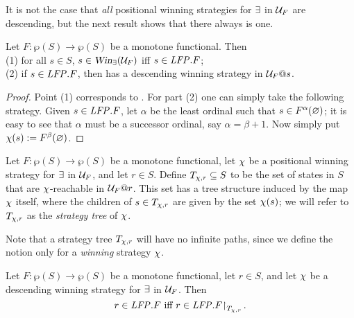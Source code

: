 It is not the case that \emph{all} positional winning strategies for $\exists$ 
in $\mathcal{U}_{F}$ are descending, but the next result shows that there always is one.

\begin{proposition}
\label{p:unfg}
Let $F: \wp(S)\to \wp(S)$ be a monotone functional.
Then
\\(1) for all $s \in S$, $s \in \win_{\eloise}(\UG_{F})$ iff $s \in \mathit{LFP}. F$;
\\(2) if $s \in \mathit{LFP}. F$, then \eloise has a descending winning strategy in 
$\mathcal{U}_{F}@s$.
\end{proposition}

\begin{proof}
Point (1) corresponds to \cite[Theorem 3.14(2)]{Ven08}.
For part (2) one can simply take the following strategy.
Given $s \in \mathit{LFP}.F$, let $\alpha$ be the least ordinal such that $s \in 
F^{\alpha}(\varnothing)$; it is easy to see that $\alpha$ must be a successor ordinal,
say $\alpha = \beta + 1$. 
Now simply put $\chi(s) := F^{\beta}(\varnothing)$.
\end{proof}

\begin{definition}
\label{d:str-tree}
Let $F: \wp(S)\to \wp(S)$ be a monotone functional, let $\chi$ be a 
positional winning strategy for $\exists$ in $\mathcal{U}_{F}$, and let $r \in S$. 
Define $T_{\chi,r} \subseteq S$ to be the set of states in $S$ that are 
$\chi$-reachable in $\mathcal{U}_{F}@r$.
This set has a tree structure induced by the map $\chi$ itself, where the 
children of $s \in T_{\chi,r}$ are given by the set $\chi(s)$; we will
refer to $T_{\chi,r}$ as the \emph{strategy tree} of
$\chi$.
\end{definition}
Note that a strategy tree $T_{\chi,r}$ will have no infinite paths, since we
define the notion only for a \emph{winning} strategy $\chi$.





\begin{proposition}
\label{p:afmc-2}
Let $F: \wp(S)\to \wp(S)$ be a monotone functional, let $r \in S$, and let $\chi$ 
be a descending winning strategy for $\exists$ in $\mathcal{U}_{F}$.
Then
\begin{equation}
\label{eq:afmc3}
r \in \LFP. F \text{ iff } r \in \LFP. F\rst{T_{\ystrat,r}}.
\end{equation}
\end{proposition}

